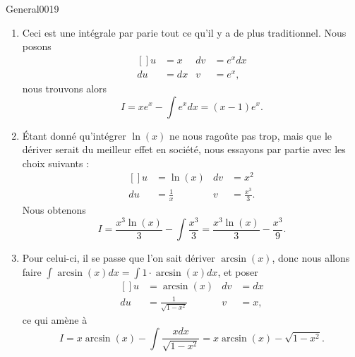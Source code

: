 \begin{corrige}{General0019}

\begin{enumerate}
\item
Ceci est une intégrale par parie tout ce qu'il y a de plus traditionnel. Nous posons
\begin{equation}
	\begin{aligned}[]
		u&=x	&	dv&= e^{x}dx\\
		du&=dx	&	v&=e^x,
	\end{aligned}
\end{equation}
nous trouvons alors
\begin{equation}
	I=xe^x-\int e^{x}dx=(x-1)e^x.
\end{equation}

\item
Étant donné qu'intégrer $\ln(x)$ ne nous ragoûte pas trop, mais que le dériver serait du meilleur effet en société, nous essayons par partie avec les choix suivants :
\begin{equation}
	\begin{aligned}[]
		u&=\ln(x)		&	dv&=x^2\\
		du&=\frac{1}{ x }	&	v&=\frac{ x^3 }{ 3 }.
	\end{aligned}
\end{equation}
Nous obtenons
\begin{equation}
	I=\frac{ x^3\ln(x) }{ 3 }-\int\frac{ x^3 }{ 3 }=\frac{ x^3\ln(x) }{ 3 }-\frac{ x^3 }{ 9 }.
\end{equation}

\item
Pour celui-ci, il se passe que l'on sait dériver $\arcsin(x)$, donc nous allons faire $\int\arcsin(x)dx=\int 1\cdot\arcsin(x)dx$, et poser
\begin{equation}
	\begin{aligned}[]
		u&=\arcsin(x)		&	dv&=dx\\
		du&=\frac{1}{ \sqrt{1-x^2} }	&	v&=x,
	\end{aligned}
\end{equation}
ce qui amène à
\begin{equation}
	I=x\arcsin(x)-\int\frac{ xdx }{ \sqrt{1-x^2} }=x\arcsin(x)-\sqrt{1-x^2}.
\end{equation}


\end{enumerate}
\end{corrige}
